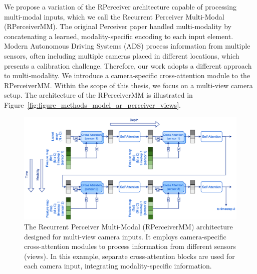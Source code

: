 
We propose a variation of the RPerceiver architecture capable of processing multi-modal inputs, which we call the Recurrent Perceiver Multi-Modal (RPerceiverMM). The original Perceiver paper \cite{jaeglePerceiverGeneralPerception2021} handled multi-modality by concatenating a learned, modality-specific encoding to each input element. Modern Autonomous Driving Systems (ADS) process information from multiple sensors, often including multiple cameras placed in different locations, which presents a calibration challenge. Therefore, our work adopts a different approach to multi-modality. We introduce a camera-specific cross-attention module to the RPerceiverMM. Within the scope of this thesis, we focus on a multi-view camera setup. The architecture of the RPerceiverMM is illustrated in Figure~\ref{fig:figure_methods_model_ar_perceiver_views}.


\begin{figure}
    \centering
    \includegraphics[width=\textwidth]{figures/figure_methods_recurrent_perceiver_mm.png}
    \caption{The Recurrent Perceiver Multi-Modal (RPerceiverMM) architecture designed for multi-view camera inputs. It employs camera-specific cross-attention modules to process information from different sensors (views). In this example, separate cross-attention blocks are used for each camera input, integrating modality-specific information.}
    \label{fig:figure_methods_recurrent_perceiver_mm}
\end{figure}

